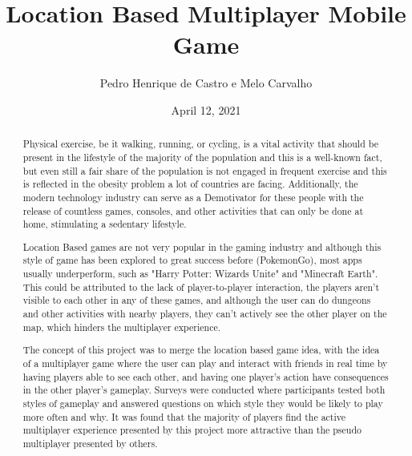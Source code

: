 \documentclass{dissertation}
\begin{document}
\title{Location Based Multiplayer Mobile Game}
\author{Pedro Henrique de Castro e Melo Carvalho}
\date{April 12, 2021}



\maketitle


\begin{abstract}

Physical exercise, be it walking, running, or cycling, is a vital activity that should be present in the lifestyle 
of the majority of the population and this is a well-known fact, but even still a fair share of the population 
is not engaged in frequent exercise and this is reflected in the obesity problem a lot of countries are facing. 
Additionally, the modern technology industry can serve as a Demotivator for these people with the release of 
countless games, consoles, and other activities that can only be done at home, stimulating a sedentary lifestyle.

Location Based games are not very popular in the gaming industry and although this style of game 
has been explored to great success before (PokemonGo), most apps usually underperform, such as "Harry Potter: 
Wizards Unite" and "Minecraft Earth". This could be attributed to the lack of player-to-player interaction, 
the players aren't visible to each other in any of these games, and although the user can do dungeons and other 
activities with nearby players, they can't actively see the other player on the map, which hinders the multiplayer 
experience.

The concept of this project was to merge the location based game idea, with the idea of a multiplayer game 
where the user can play and interact with friends in real time by having players able to see each other, and 
having one player's action have consequences in the other player's gameplay. Surveys were conducted where 
participants tested both styles of gameplay and answered questions on which style they would be likely to play 
more often and why. It was found that the majority of players find the active multiplayer experience presented 
by this project more attractive than the pseudo multiplayer presented by others.

\end{abstract}
\end{document}
